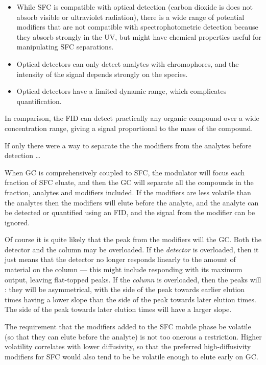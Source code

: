 \begin{itemize}

\item While SFC is compatible with optical detection (carbon dioxide is does not
absorb visible or ultraviolet radiation), there is a wide range of potential
modifiers that are not compatible with spectrophotometric detection because they
absorb strongly in the UV, but might have chemical properties useful for
manipulating SFC separations.

\item Optical detectors can only detect analytes with chromophores, and the
intensity of the signal depends strongly on the species.

\item Optical detectors have a limited dynamic range, which complicates quantification. 

\end{itemize}

In comparison, the FID can detect practically any organic compound over a wide
concentration range, giving a signal proportional to the mass of the compound.

If only there were a way to separate the the modifiers from the analytes before
detection \ldots

When GC is comprehensively coupled to SFC, the modulator will focus each
fraction of SFC eluate, and then the GC will separate all the compounds in the
fraction, analytes and modifiers included. If the modifiers are less volatile
than the analytes then the modifiers will elute before the analyte, and the
analyte can be detected or quantified using an FID, and the signal from the
modifier can be ignored.

Of course it is quite likely that the peak from the modifiers will
 the GC. Both the detector and the column may be overloaded.
If the \emph{detector} is overloaded, then it just means that the detector no
longer responds linearly to the amount of material on the column --- this might
include responding with its maximum output, leaving flat-topped peaks. If the
\emph{column} is overloaded, then the peaks will : they will be
asymmetrical, with the side of the peak towards earlier elution times having a
lower slope than the side of the peak towards later elution times. The side of
the peak towards later elution times will have a larger slope.

The requirement that the modifiers added to the SFC mobile phase be volatile (so
that they can elute before the analyte) is not too onerous a restriction. Higher
volatility correlates with lower diffusivity, so that the preferred
high-diffusivity modifiers for SFC  would also tend to be be volatile enough to
elute early on GC. 

